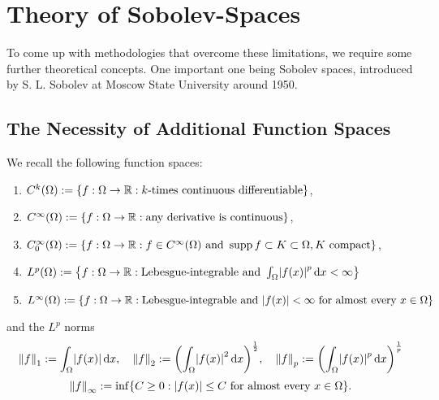 \section{Theory of Sobolev-Spaces}

To come up with methodologies that overcome these limitations, we require some further theoretical concepts.
One important one being Sobolev spaces, introduced by S. L. Sobolev at Moscow State University around 1950.


\subsection{The Necessity of Additional Function Spaces}

\begin{definition}
	We recall the following function spaces:
	\begin{enumerate}
		\item \(C^k\parentheses*{\Omega} := \braces*{f: \Omega \to \R : k\text{-times continuous differentiable}}\),
		\item \(C^\infty\parentheses*{\Omega} := \braces*{f: \Omega \to \R : \text{any derivative is continuous}}\),
		\item \(C_0^\infty\parentheses*{\Omega} := \braces*{f: \Omega \to \R : f \in C^\infty\parentheses*{\Omega}\text{ and }\supp f \subset K \subset \Omega, K\text{ compact}}\),
		\item \(L^p\parentheses*{\Omega} := \braces*{f: \Omega \to \R : \text{Lebesgue-integrable and }\int_\Omega \absolute*{f\parentheses*{x}}^p \d x < \infty}\)
		\item \(L^\infty\parentheses*{\Omega} := \braces*{f: \Omega \to \R : \text{Lebesgue-integrable and }\absolute*{f\parentheses*{x}} < \infty\text{ for almost every }x \in \Omega}\)
	\end{enumerate}
	and the \(L^p\) norms
	\[
		\norm*{f}_1 := \int_\Omega \absolute*{f\parentheses*{x}}\d x, \quad \norm*{f}_2 := \parentheses*{\int_\Omega \absolute*{f\parentheses*{x}}^2 \d x}^{\frac{1}{2}}, \quad \norm*{f}_p := \parentheses*{\int_\Omega \absolute*{f\parentheses*{x}}^p \d x}^{\frac{1}{p}}
	\]
	\[
		\norm*{f}_\infty := \inf\braces*{C \ge 0 : \absolute*{f\parentheses*{x}} \le C\text{ for almost every }x \in \Omega}.
	\]
\end{definition}

